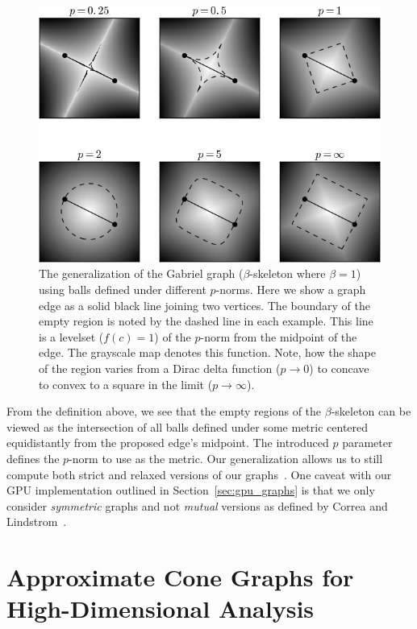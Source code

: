 \begin{figure}[htbp]
    \includegraphics[width=\linewidth]{figs/chap7/emptyRegions}
    \caption{The generalization of the Gabriel graph ($\beta$-skeleton where $\beta=1$) using balls defined under different $p$-norms.
    Here we show a graph edge as a solid black line joining two vertices.
    The boundary of the empty region is noted by the dashed line in each example.
    This line is a levelset ($f(c)=1$) of the $p$-norm from the midpoint of the edge.
    The grayscale map denotes this function.
    Note, how the shape of the region varies from a Dirac delta function ($p \rightarrow 0$) to concave to convex to a square in the limit ($p \rightarrow \infty$).}
    \label{fig:gabriel_p_shapes}
\end{figure}

From the definition above, we see that the empty regions of the $\beta$-skeleton can be viewed as the intersection of all balls defined under some metric centered equidistantly from the proposed edge's midpoint.
%
The introduced $p$ parameter defines the $p$-norm to use as the metric.
%
Our generalization allows us to still compute both strict and relaxed versions of our graphs~\cite{CorreaLindstrom2011}.
%
One caveat with our GPU implementation outlined in Section~\ref{sec:gpu_graphs} is that we only consider \textit{symmetric} graphs and not \textit{mutual} versions as defined by Correa and Lindstrom~\cite{CorreaLindstrom2011}.

\section{Approximate Cone Graphs for High-Dimensional Analysis}

